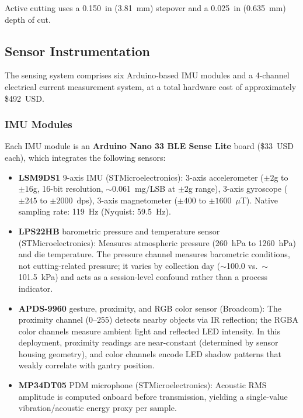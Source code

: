 Active cutting uses a \SI{0.150}{in} (\SI{3.81}{\milli\meter}) stepover and a \SI{0.025}{in} (\SI{0.635}{\milli\meter}) depth of cut.

\subsection{Sensor Instrumentation}

The sensing system comprises six Arduino-based IMU modules and a 4-channel electrical current measurement system, at a total hardware cost of approximately \$492~USD.

\subsubsection{IMU Modules}

Each IMU module is an \textbf{Arduino Nano 33 BLE Sense Lite} board (\$33~USD each), which integrates the following sensors:

\begin{itemize}
    \item \textbf{LSM9DS1} 9-axis IMU (STMicroelectronics): 3-axis accelerometer ($\pm 2$g to $\pm 16$g, 16-bit resolution, $\sim$0.061~mg/LSB at $\pm 2$g range), 3-axis gyroscope ($\pm 245$ to $\pm 2000$~dps), 3-axis magnetometer ($\pm 400$ to $\pm 1600$~$\mu$T). Native sampling rate: \SI{119}{\hertz} (Nyquist: \SI{59.5}{\hertz}).
    \item \textbf{LPS22HB} barometric pressure and temperature sensor (STMicroelectronics): Measures atmospheric pressure (\SI{260}{\hecto\pascal} to \SI{1260}{\hecto\pascal}) and die temperature. The pressure channel measures barometric conditions, not cutting-related pressure; it varies by collection day ($\sim$100.0 vs.\ $\sim$101.5~kPa) and acts as a session-level confound rather than a process indicator.
    \item \textbf{APDS-9960} gesture, proximity, and RGB color sensor (Broadcom): The proximity channel ($0$--$255$) detects nearby objects via IR reflection; the RGBA color channels measure ambient light and reflected LED intensity. In this deployment, proximity readings are near-constant (determined by sensor housing geometry), and color channels encode LED shadow patterns that weakly correlate with gantry position.
    \item \textbf{MP34DT05} PDM microphone (STMicroelectronics): Acoustic RMS amplitude is computed onboard before transmission, yielding a single-value vibration/acoustic energy proxy per sample.
\end{itemize}

